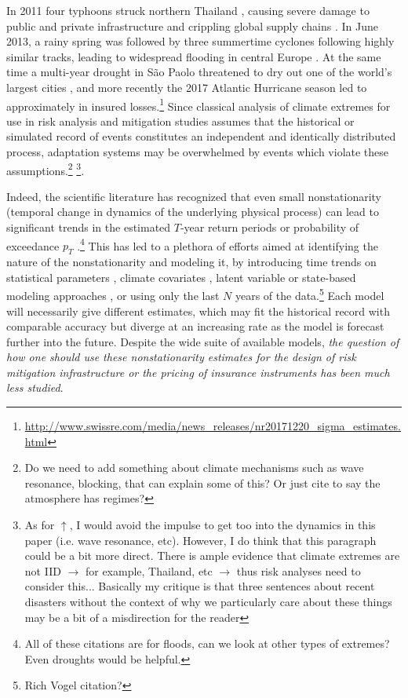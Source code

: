 \documentclass[12pt]{article}
\begin{document}
In 2011 four typhoons struck northern Thailand \citep{Gale2013}, causing severe damage to public and private infrastructure and crippling global supply chains \citep{Haraguchi2015}.
In June 2013, a rainy spring was followed by three summertime cyclones following highly similar tracks, leading to widespread flooding in central Europe \citep{Grams2014}.
At the same time a multi-year drought in S\~ao Paolo threatened to dry out one of the world's largest cities \citep{Seth2015}, and more recently the 2017 Atlantic Hurricane season led to approximately  in insured losses.\footnote{\url{http://www.swissre.com/media/news_releases/nr20171220_sigma_estimates.html}}
Since classical analysis of climate extremes for use in risk analysis and mitigation studies assumes that  the historical or simulated record of events constitutes an independent and identically distributed process, adaptation systems may be overwhelmed by events which violate these assumptions.\footnote{Do we need to add something about climate mechanisms such as wave resonance, blocking, \etc{} that can explain some of this? Or just cite \citet{Hannachi2017} to say the atmosphere has regimes?} \footnote{As for $\uparrow$, I would avoid the impulse to get too into the dynamics in this paper (i.e. wave resonance, etc). However, I do think that this paragraph could be a bit more direct. There is ample evidence that climate extremes are not IID $\rightarrow$ for example, Thailand, etc $\rightarrow$ thus risk analyses need to consider this... Basically my critique is that three sentences about recent disasters without the context of why we particularly care about these things may be a bit of a misdirection for the reader}.

Indeed, the scientific literature has recognized that even small nonstationarity (temporal change in dynamics of the underlying physical process) can lead to significant trends in the estimated $T$-year return periods or probability of exceedance $p_T$ \citep{Milly2008,Vogel2011,Salas2014,Merz2014,Obeysekera2016}.\footnote{All of these citations are for floods, can we look at other types of extremes? Even droughts would be helpful.}
This has led to a plethora of efforts aimed at identifying the nature of the nonstationarity and modeling it, \eg{} by introducing time trends on statistical parameters \citep{Strupczewski2001,Vogel2011,Obeysekera2014,Serinaldi2015}, climate covariates \citep{Delgado2014,Griffis2007,Silva2016,Sun2014,Hall2014}, latent variable or state-based modeling approaches \citep{Griffis2007,Sveinsson2005,Waylen1986}, or using only the last $N$ years of the data.\footnote{Rich Vogel citation?}
Each model will necessarily give different estimates, which may fit the historical record with comparable accuracy but diverge at an increasing rate as the model is forecast further into the future.
Despite the wide suite of available models, \emph{the question of how one should use these nonstationarity estimates for the design of risk mitigation infrastructure or the pricing of insurance instruments has been much less studied}.
\end{document}
